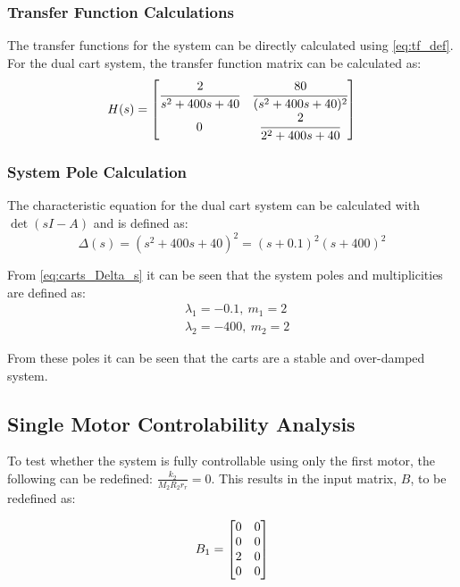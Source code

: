 \documentclass[]{article}
\begin{document}
		\subsubsection{Transfer Function Calculations}
			The transfer functions for the system can be directly calculated using \eqref{eq:tf_def}. For the dual cart system, the transfer function matrix can be calculated as:
			\begin{equation}
				H(s) = \mqty[	\cfrac{2}{s^2+400s+40}	&\cfrac{80}{(s^2+400s+40)^2}\\
								0						&\cfrac{2}{2^2+400s+40}
								]
			\end{equation}
	
		\subsubsection{System Pole Calculation}
			The characteristic equation for the dual cart system can be calculated with $\det(sI-A)$ and is defined as:
			\begin{equation}
				\Delta (s) = (s^2 + 400s +40)^2 = (s+0.1)^2(s+400)^2
				\label{eq:carts_Delta_s}
			\end{equation}
			
			From \eqref{eq:carts_Delta_s} it can be seen that the system poles and multiplicities are defined as:
			\begin{equation}
				\begin{aligned}
					&\lambda_1 = -0.1, \ m_1 = 2\\
					&\lambda_2 = -400, \ m_2 = 2
				\end{aligned}
			\end{equation}
		
			From these poles it can be seen that the carts are a stable and over-damped system.
	
	\newpage
	\subsection{Single Motor Controlability Analysis}
		To test whether the system is fully controllable using only the first motor, the following can be redefined: $\frac{k_2}{M_2 R_2 r_r} = 0$. This results in the input matrix, $B$, to be redefined as:
		
		\begin{equation}
			B_1 = \mqty[0	&0\\
						0	&0\\
						2	&0\\
						0	&0]
		\end{equation}
		
\end{document}
